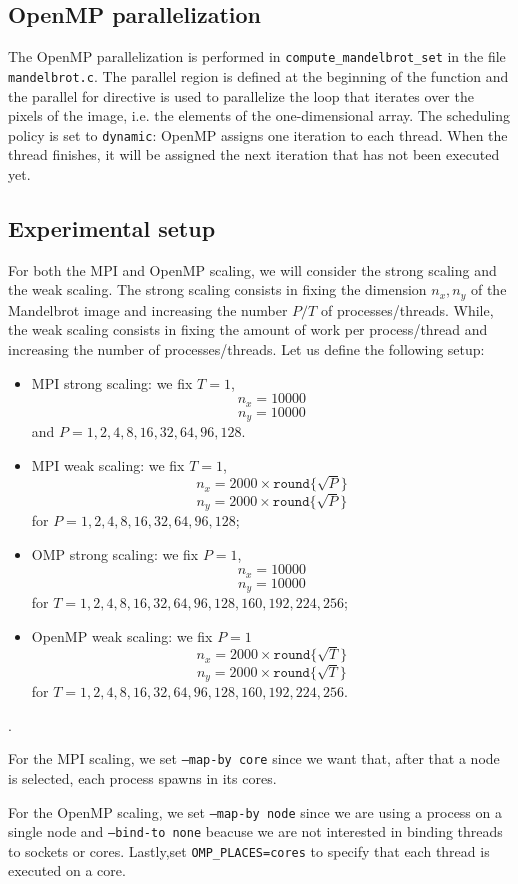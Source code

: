 \subsection{OpenMP parallelization}

The OpenMP parallelization is performed in \texttt{compute\_mandelbrot\_set} in the file \texttt{mandelbrot.c}. The parallel region is defined at the beginning of the function and the parallel for directive is used to parallelize the loop that iterates over the pixels of the image, i.e. the elements of the one-dimensional array. The scheduling policy is set to \texttt{dynamic}: OpenMP assigns one iteration to each thread. When the thread finishes, it will be assigned the next iteration that has not been executed yet.

\subsection{Experimental setup}

For both the MPI and OpenMP scaling, we will consider the strong scaling and the weak scaling. The strong scaling consists in fixing the dimension $n_x, n_y$ of the Mandelbrot image and increasing the number $P/T$ of processes/threads. While, the weak scaling consists in fixing the amount of work per process/thread and increasing the number of processes/threads.
Let us define the following setup:
\begin{itemize}
    \item MPI strong scaling: we fix $T=1$,
        $$n_x = 10000$$
        $$n_y = 10000$$
    and $P = 1, 2, 4, 8, 16, 32, 64, 96, 128$.
    \item MPI weak scaling: we fix $T=1$, 
        $$n_x = 2000 \times \texttt{round} \{\sqrt{P}\}$$
        $$n_y = 2000 \times \texttt{round}\{\sqrt{P}\}$$
    for $P = 1, 2, 4, 8, 16, 32, 64, 96, 128$;
    \item OMP strong scaling: we fix $P=1$,
        $$n_x = 10000$$
        $$n_y = 10000$$
    for $T = 1, 2, 4, 8, 16, 32, 64, 96, 128, 160, 192, 224, 256$;
    \item OpenMP weak scaling: we fix $P=1$
        $$n_x = 2000 \times \texttt{round}\{\sqrt{T}\}$$
        $$n_y = 2000 \times \texttt{round}\{\sqrt{T}\}$$
    for $T = 1, 2, 4, 8, 16, 32, 64, 96, 128, 160, 192, 224, 256$.
\end{itemize}.

For the MPI scaling, we set \texttt{--map-by core} since we want that, after that a node is selected, each process spawns in its cores.

For the OpenMP scaling, we set \texttt{--map-by node} since we are using a process on a single node and \texttt{--bind-to none} beacuse we are not interested in binding threads to sockets or cores. Lastly,set \texttt{OMP\_PLACES=cores} to specify that each thread is executed on a core.